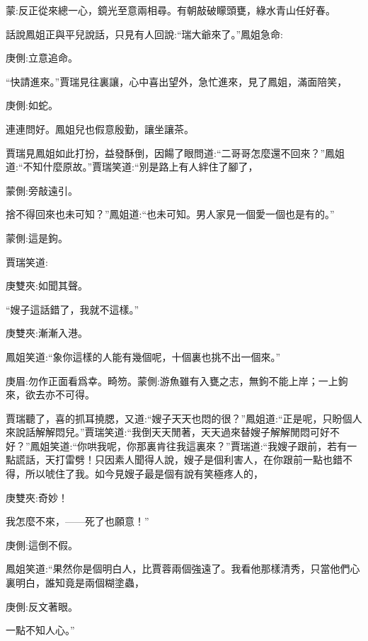 
\begin{parag}
    \begin{note}蒙:反正從來總一心，鏡光至意兩相尋。有朝敲破矇頭甕，綠水青山任好春。\end{note}
\end{parag}


\begin{parag}
    話說鳳姐正與平兒說話，只見有人回說:“瑞大爺來了。”鳳姐急命:\begin{note}庚側:立意追命。\end{note}“快請進來。”賈瑞見往裏讓，心中喜出望外，急忙進來，見了鳳姐，滿面陪笑，\begin{note}庚側:如蛇。\end{note}連連問好。鳳姐兒也假意殷勤，讓坐讓茶。
\end{parag}


\begin{parag}
    賈瑞見鳳姐如此打扮，益發酥倒，因餳了眼問道:“二哥哥怎麼還不回來？”鳳姐道:“不知什麼原故。”賈瑞笑道:“別是路上有人絆住了腳了，\begin{note}蒙側:旁敲遠引。\end{note}捨不得回來也未可知？”鳳姐道:“也未可知。男人家見一個愛一個也是有的。”\begin{note}蒙側:這是鉤。\end{note}賈瑞笑道:\begin{note}庚雙夾:如聞其聲。\end{note}“嫂子這話錯了，我就不這樣。”\begin{note}庚雙夾:漸漸入港。\end{note}鳳姐笑道:“象你這樣的人能有幾個呢，十個裏也挑不出一個來。”\begin{note}庚眉:勿作正面看爲幸。畸笏。蒙側:游魚雖有入甕之志，無鉤不能上岸；一上鉤來，欲去亦不可得。\end{note}賈瑞聽了，喜的抓耳撓腮，又道:“嫂子天天也悶的很？”鳳姐道:“正是呢，只盼個人來說話解解悶兒。”賈瑞笑道:“我倒天天閒著，天天過來替嫂子解解閒悶可好不好？”鳳姐笑道:“你哄我呢，你那裏肯往我這裏來？”賈瑞道:“我嫂子跟前，若有一點謊話，天打雷劈！只因素人聞得人說，嫂子是個利害人，在你跟前一點也錯不得，所以唬住了我。如今見嫂子最是個有說有笑極疼人的，\begin{note}庚雙夾:奇妙！\end{note}我怎麼不來，——死了也願意！”\begin{note}庚側:這倒不假。\end{note}鳳姐笑道:“果然你是個明白人，比賈蓉兩個強遠了。我看他那樣清秀，只當他們心裏明白，誰知竟是兩個糊塗蟲，\begin{note}庚側:反文著眼。\end{note}一點不知人心。”
\end{parag}



